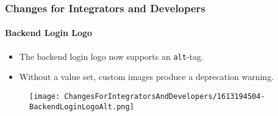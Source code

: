 %

\begin{frame}[fragile]
	\frametitle{Changes for Integrators and Developers}
	\framesubtitle{Backend Login Logo}


	\begin{itemize}
		\item The backend login logo now supports an \texttt{alt}-tag.
		\item Without a value set, custom images produce a deprecation warning.
	\end{itemize}

	\begin{figure}
		\texttt{[image: ChangesForIntegratorsAndDevelopers/1613194504-BackendLoginLogoAlt.png]}
	\end{figure}

\end{frame}

